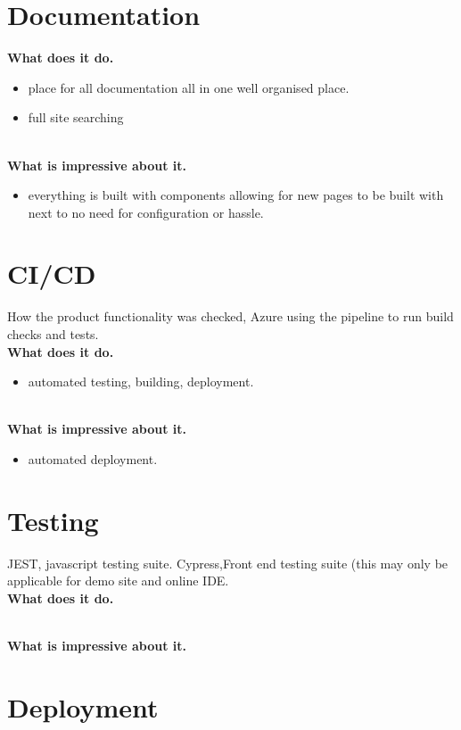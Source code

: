 \documentclass{l4proj}
\begin{document}
\section{Documentation}
\textbf{What does it do.}
\begin{itemize}
    \item place for all documentation all in one well organised place.
    \item full site searching
\end{itemize}
\\
\textbf{What is impressive about it.}
\begin{itemize}
    \item everything is built with components allowing for new pages to be built with next to no need for configuration or hassle.
\end{itemize}
\section{CI/CD}
\text How the product functionality was checked, Azure using the pipeline to run build checks and tests.
\\
\textbf{What does it do.}
\begin{itemize}
    \item automated testing, building, deployment.
\end{itemize}
\\
\textbf{What is impressive about it.}
\begin{itemize}
    \item automated deployment.
\end{itemize}


\section{Testing}
\text JEST, javascript testing suite. Cypress,Front end testing suite (this may only be applicable for demo site and online IDE.
\\
\textbf{What does it do.}

\\
\textbf{What is impressive about it.}



\section{Deployment}
\end{document}
